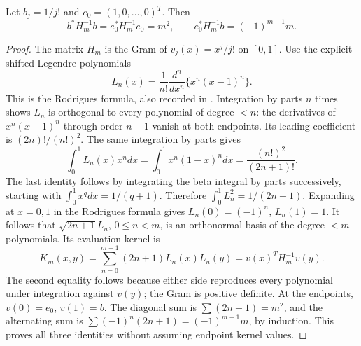 \documentclass[11pt]{article}
\begin{document}
\begin{eglemma}\label{eg:lem:Legendre}
Let $b_j=1/j!$ and $e_0=(1,0,\ldots,0)^T$. Then
\[
 b^*H_m^{-1}b=e_0^*H_m^{-1}e_0=m^2,\qquad
                  e_0^*H_m^{-1}b=(-1)^{m-1}m.
 \tag{EG48}\label{eg:eq:Legendre-values}
\]
\end{eglemma}
\begin{proof}
The matrix $H_m$ is the Gram of $v_j(x)=x^j/j!$ on $[0,1]$.
Use the explicit shifted Legendre polynomials
\[
 L_n(x)=\frac1{n!}\frac{d^n}{dx^n}\{x^n(x-1)^n\}.
\]
This is the Rodrigues formula, also recorded in
\cite[\S18.5(ii)]{eg:DLMFLegendre}. Integration by parts $n$ times
shows $L_n$ is orthogonal to every polynomial of degree $<n$:
the derivatives of $x^n(x-1)^n$ through order $n-1$ vanish at both
endpoints. Its leading coefficient is $(2n)!/(n!)^2$.
The same integration by parts gives
\[
 \int_0^1 L_n(x)x^n dx=\int_0^1x^n(1-x)^n dx
                   =\frac{(n!)^2}{(2n+1)!}.
\]
The last identity follows by integrating the beta integral by parts
successively, starting with $\int_0^1x^qdx=1/(q+1)$.
Therefore $\int_0^1L_n^2=1/(2n+1)$. Expanding at $x=0,1$ in
the Rodrigues formula gives $L_n(0)=(-1)^n$, $L_n(1)=1$.
It follows that $\sqrt{2n+1}L_n$, $0\le n<m$, is an orthonormal
basis of the degree-$<m$ polynomials. Its evaluation kernel is
\[
 K_m(x,y)=\sum_{n=0}^{m-1}(2n+1)L_n(x)L_n(y)
                     =v(x)^T H_m^{-1}v(y).
\]
The second equality follows because either side reproduces every
polynomial under integration against $v(y)$; the Gram is positive
definite. At the endpoints, $v(0)=e_0$, $v(1)=b$. The diagonal sum
is $\sum(2n+1)=m^2$, and the alternating sum is
$\sum(-1)^n(2n+1)=(-1)^{m-1}m$, by induction. This proves all three
identities without assuming endpoint kernel values.
\end{proof}
\end{document}
